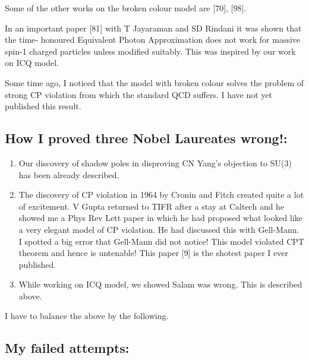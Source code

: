 Some of the other works on the broken colour model are [70], [98].

In an important paper [81] with T Jayaraman and SD Rindani it was shown 
that the time- honoured Equivalent Photon Approxi\-mation does not work 
for massive spin-1 charged particles unless modified suitably. This was 
inspired by our work on ICQ model.

Some time ago, I noticed that the model with broken colour solves the 
problem of strong CP violation from which the standard QCD suffers. I 
have not yet published this result.


\vspace{-.3cm}

\subsection*{How I proved three Nobel Laureates wrong!:}

\begin{enumerate}
\itemsep=0pt
\item Our discovery of shadow poles in disproving CN Yang's objec\-tion to 
SU(3) has been already described.
\item The discovery of CP violation in 1964 by Cronin and Fitch created 
quite a lot of excitement. V Gupta returned to TIFR after a stay at 
Caltech and he showed me a Phys Rev Lett paper in which he had proposed 
what looked like a very elega\-nt model of CP violation. He had discussed 
this with Gell-Mann. I spotted a big error that Gell-Mann did not 
notice! This model violated CPT theorem and hence is untenab\-le! This 
paper [9] is the shotest paper I ever published.
\item While working on ICQ model, we showed Salam was wrong. This is 
described above.
\end{enumerate}

I have to balance the above by the following.


\vspace{-.3cm}

\subsection*{My failed attempts:}

